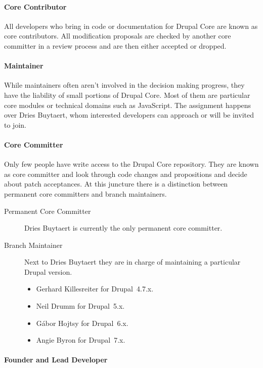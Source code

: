 \paragraph{Core Contributor}

All developers who bring in code or documentation for Drupal Core are known as
core contributors. All modification proposals are checked by another core
committer in a review process and are then either accepted or dropped.

\paragraph{Maintainer}

While maintainers often aren't involved in the decision making progress, they
have the liability of small portions of Drupal Core. Most of them are
particular core modules or technical domains such as JavaScript. The assignment
happens over Dries Buytaert, whom interested developers can approach or will be
invited to join.

\paragraph{Core Committer}

Only few people have write access to the Drupal Core repository. They are known
as core committer and look through code changes and propositions and decide
about patch acceptances. At this juncture there is a distinction between
permanent core committers and branch maintainers.

\begin{description}
  \item[Permanent Core Committer] Dries Buytaert is currently the only permanent core
    committer.
  \item[Branch Maintainer] Next to Dries Buytaert they are in charge of
  maintaining a particular Drupal version.
  \begin{itemize}
    \item Gerhard Killesreiter for Drupal~4.7.x.
    \item Neil Drumm for Drupal~5.x.
    \item Gábor Hojtsy for Drupal~6.x.
    \item Angie Byron for Drupal~7.x.
  \end{itemize}
\end{description}

\paragraph{Founder and Lead Developer}

